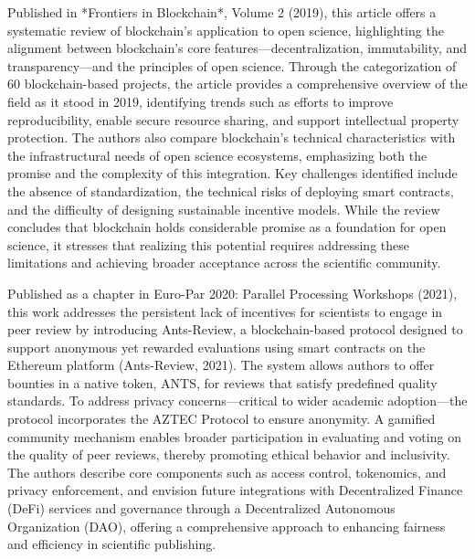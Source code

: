 \documentclass{article}
\begin{document}

Published in *Frontiers in Blockchain*, Volume 2 (2019), this article offers a systematic review of blockchain’s application to open science, highlighting the alignment between blockchain’s core features—decentralization, immutability, and transparency—and the principles of open science. Through the categorization of 60 blockchain-based projects, the article provides a comprehensive overview of the field as it stood in 2019, identifying trends such as efforts to improve reproducibility, enable secure resource sharing, and support intellectual property protection. The authors also compare blockchain’s technical characteristics with the infrastructural needs of open science ecosystems, emphasizing both the promise and the complexity of this integration. Key challenges identified include the absence of standardization, the technical risks of deploying smart contracts, and the difficulty of designing sustainable incentive models. While the review concludes that blockchain holds considerable promise as a foundation for open science, it stresses that realizing this potential requires addressing these limitations and achieving broader acceptance across the scientific community.


Published as a chapter in Euro-Par 2020: Parallel Processing Workshops (2021), this work addresses the persistent lack of incentives for scientists to engage in peer review by introducing Ants-Review, a blockchain-based protocol designed to support anonymous yet rewarded evaluations using smart contracts on the Ethereum platform (Ants-Review, 2021). The system allows authors to offer bounties in a native token, ANTS, for reviews that satisfy predefined quality standards. To address privacy concerns—critical to wider academic adoption—the protocol incorporates the AZTEC Protocol to ensure anonymity. A gamified community mechanism enables broader participation in evaluating and voting on the quality of peer reviews, thereby promoting ethical behavior and inclusivity. The authors describe core components such as access control, tokenomics, and privacy enforcement, and envision future integrations with Decentralized Finance (DeFi) services and governance through a Decentralized Autonomous Organization (DAO), offering a comprehensive approach to enhancing fairness and efficiency in scientific publishing.
\end{document}

